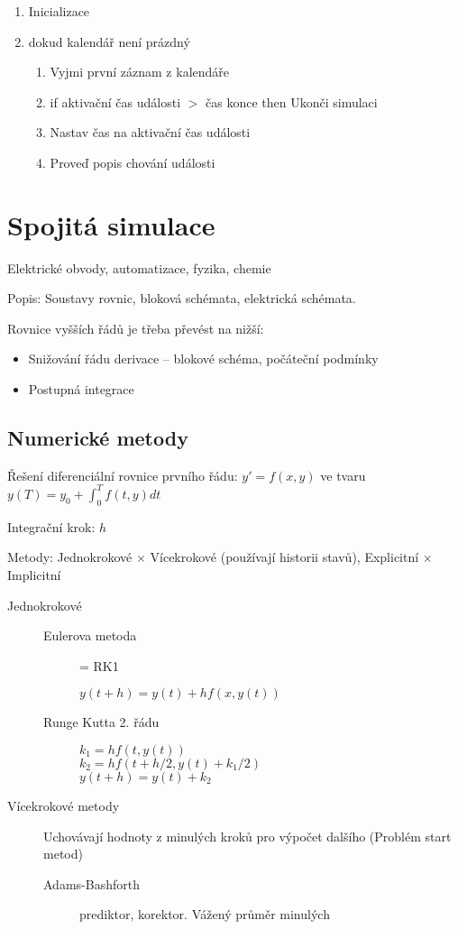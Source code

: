 \documentclass[a4paper, 11pt]{report}
\begin{document}
\begin{enumerate}
	\item Inicializace
	\item dokud kalendář není prázdný
	\begin{enumerate}
		\item Vyjmi první záznam z kalendáře
		\item if aktivační čas události $>$ čas konce then Ukonči simulaci
		\item Nastav čas na aktivační čas události
		\item Proveď popis chování události
	\end{enumerate}
\end{enumerate}

\section{Spojitá simulace}

Elektrické obvody, automatizace, fyzika, chemie

Popis: Soustavy rovnic, bloková schémata, elektrická schémata.

Rovnice vyšších řádů je třeba převést na nižší:
\begin{itemize}
	\item Snižování řádu derivace -- blokové schéma, počáteční podmínky
	\item Postupná integrace
\end{itemize}

\subsection{Numerické metody}

Řešení diferenciální rovnice prvního řádu: $y' = f(x,y)$ ve tvaru $y(T) = y_0 + \int_0^T f(t,y)dt$

Integrační krok: $h$

Metody: Jednokrokové $\times$ Vícekrokové (používají historii stavů), Explicitní $\times$ Implicitní
\begin{description}
	\item[Jednokrokové] \hfill
	\begin{description}
		\item[Eulerova metoda] = RK1
		
		$y(t+h) = y(t) + h f(x, y(t) )$
		\item[Runge Kutta 2. řádu] \hfill

		$k_1 = hf(t, y(t))$\\
		$k_2 = hf(t + h/2, y(t) + k_1/2)$\\
		$y(t+h) = y(t) + k_2$
	\end{description}
	\item[Vícekrokové metody] Uchovávají hodnoty z minulých kroků pro výpočet dalšího (Problém start metod)
	\begin{description}
		\item[Adams-Bashforth] prediktor, korektor. Vážený průměr minulých
	\end{description}
\end{description}
\end{document}
